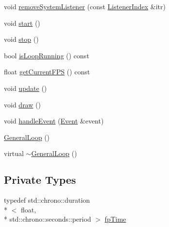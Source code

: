 \begin{DoxyCompactItemize}
\item 
void \hyperlink{classZeta_1_1GeneralLoop_a1cbaa4500e8ee1c2d8de6633b96b9221}{remove\+System\+Listener} (const \hyperlink{classZeta_1_1GeneralLoop_a1e3fa8c44577a032a92aca0828310d30}{Listener\+Index} \&itr)
\item 
void \hyperlink{classZeta_1_1GeneralLoop_a748f6265153c6a08e3413bdd2f58ee89}{start} ()
\item 
void \hyperlink{classZeta_1_1GeneralLoop_ae31c6fb01360a94070c65c3cec4345ba}{stop} ()
\item 
bool \hyperlink{classZeta_1_1GeneralLoop_a53cbe7a1e4a10f2ef0cc23b62cb34ff8}{is\+Loop\+Running} () const 
\item 
float \hyperlink{classZeta_1_1GeneralLoop_abc9e31895b7942a7da5d3381356660a3}{get\+Current\+F\+P\+S} () const 
\item 
void \hyperlink{classZeta_1_1GeneralLoop_a53c6783932abb77d44760c218d2662c8}{update} ()
\item 
void \hyperlink{classZeta_1_1GeneralLoop_a8eacfbb51e318b435eb7f181d029c175}{draw} ()
\item 
void \hyperlink{classZeta_1_1GeneralLoop_a06b8656bbb27d183f74ba0bea8b6b7c9}{handle\+Event} (\hyperlink{classZeta_1_1Event}{Event} \&event)
\item 
\hyperlink{classZeta_1_1GeneralLoop_a4a1e4bd5d7176c6ddef32268c7d1aee6}{General\+Loop} ()
\item 
virtual \hyperlink{classZeta_1_1GeneralLoop_a7e2c9f744ce2419b8ecc3183372ab714}{$\sim$\+General\+Loop} ()
\end{DoxyCompactItemize}
\subsection*{Private Types}
\begin{DoxyCompactItemize}
\item 
typedef std\+::chrono\+::duration\\*
$<$ float, \\*
std\+::chrono\+::seconds\+::period $>$ \hyperlink{classZeta_1_1GeneralLoop_a08762f0ffcb03c63096b0da1f5cdf24d}{fp\+Time}
\end{DoxyCompactItemize}
